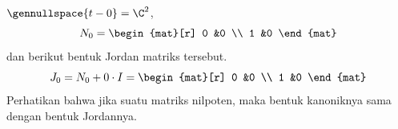 \begin{exercises}
\begin{answer}
\begin{exparts}
           $\gennullspace{t-0}=\C^2$,
           \begin{equation*}
             N_0=
             \begin{mat}[r]
               0  &0  \\
               1  &0
            \end{mat}
           \end{equation*}
           dan berikut bentuk Jordan matriks tersebut.
           \begin{equation*}
             J_0=N_0+0\cdot I=
             \begin{mat}[r]
               0  &0  \\
               1  &0
            \end{mat}
           \end{equation*}
           Perhatikan bahwa jika suatu matriks nilpoten, maka bentuk kanoniknya
           sama dengan bentuk Jordannya.


\end{exparts}
\end{answer}
\end{exercises}
